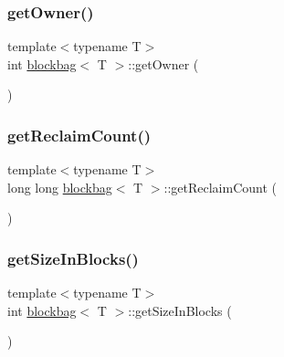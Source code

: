\mbox{\label{classblockbag_ada8476d80376cec8051d5cba57d99d4f}} 
\subsubsection{\texorpdfstring{get\+Owner()}{getOwner()}}
{\footnotesize\ttfamily template$<$typename T$>$ \\
int \hyperlink{classblockbag}{blockbag}$<$ T $>$\+::get\+Owner (\begin{DoxyParamCaption}{ }\end{DoxyParamCaption})\hspace{0.3cm}{\ttfamily [inline]}}

\mbox{\label{classblockbag_a43feda8d7817bfb6a857f83bf02a5edb}} 
\subsubsection{\texorpdfstring{get\+Reclaim\+Count()}{getReclaimCount()}}
{\footnotesize\ttfamily template$<$typename T$>$ \\
long long \hyperlink{classblockbag}{blockbag}$<$ T $>$\+::get\+Reclaim\+Count (\begin{DoxyParamCaption}{ }\end{DoxyParamCaption})\hspace{0.3cm}{\ttfamily [inline]}}

\mbox{\label{classblockbag_ab59a59fd142e5b42d67580662012543d}} 
\subsubsection{\texorpdfstring{get\+Size\+In\+Blocks()}{getSizeInBlocks()}}
{\footnotesize\ttfamily template$<$typename T$>$ \\
int \hyperlink{classblockbag}{blockbag}$<$ T $>$\+::get\+Size\+In\+Blocks (\begin{DoxyParamCaption}{ }\end{DoxyParamCaption})\hspace{0.3cm}{\ttfamily [inline]}}

